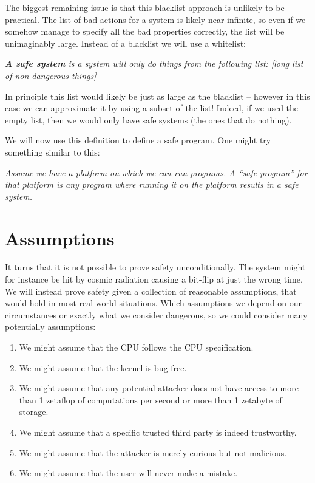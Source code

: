 The biggest remaining issue is that this blacklist approach is unlikely to be
practical. The list of bad actions for a system is likely near-infinite, so even
if we somehow manage to specify all the bad properties correctly, the list will
be unimaginably large. Instead of a blacklist we will use a whitelist:

\vspace{0.3cm}
\begin{addmargin}{1cm}
  {\it \textbf{A safe system} is a system will only do things from the following
    list: [long list of non-dangerous things]}
\end{addmargin}
\vspace{0.3cm}

In principle this list would likely be just as large as the blacklist -- however
in this case we can approximate it by using a subset of the list! Indeed, if we
used the empty list, then we would only have safe systems (the ones that do
nothing).

We will now use this definition to define a safe program. One might try
something similar to this:

\vspace{0.3cm}
\begin{addmargin}{1cm}
  {\it Assume we have a platform on which we can run programs. A ``safe
    program'' for that platform is any program where running it on the platform
    results in a safe system.}
\end{addmargin}
\vspace{0.3cm}

\section{Assumptions}
It turns that it is not possible to prove safety unconditionally. The system
might for instance be hit by cosmic radiation causing a bit-flip at just the
wrong time. We will instead prove safety given a collection of reasonable
assumptions, that would hold in most real-world situations. Which assumptions we
depend on our circumstances or exactly what we consider dangerous, so we could
consider many potentially assumptions:

\begin{enumerate}
\item We might assume that the CPU follows the CPU specification.
\item We might assume that the kernel is bug-free.
\item We might assume that any potential attacker does not have access to more
  than 1 zetaflop of computations per second or more than 1 zetabyte of storage.
\item We might assume that a specific trusted third party is indeed trustworthy.
\item We might assume that the attacker is merely curious but not malicious.
\item We might assume that the user will never make a mistake.
\end{enumerate}


